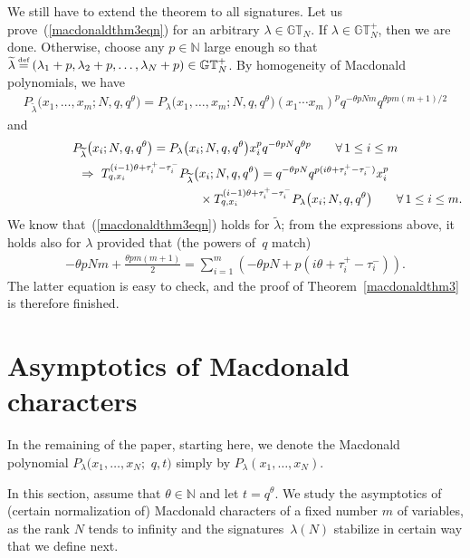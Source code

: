 \documentclass[pdftex]{sigma}
\numberwithin{equation}{section}
\newcommand\myeq{\mathrel{\stackrel{\makebox[0pt]{\mbox{\normalfont\tiny def}}}{=}}}
\newcommand{\N}{\mathbb{N}}
\newcommand{\GT}{\mathbb{GT}}
\newcommand{\GTp}{\mathbb{GT}^+}
\begin{document}
We still have to extend the theorem to all signatures. Let us prove~(\ref{macdonaldthm3eqn}) for an arbitrary $\lambda\in\GT_N$. If $\lambda\in\GTp_N$, then we are done. Otherwise, choose any $p\in\N$ large enough so that $\widetilde{\lambda} \myeq (\lambda_1 + p, \lambda_2 + p, \dots, \lambda_N + p)\in\GTp_N$. By homogeneity of Macdonald polynomials, we have
\begin{gather*}
P_{\widetilde{\lambda}}\big(x_1, \dots, x_m; N, q, q^{\theta}\big) = P_{\lambda}\big(x_1, \dots, x_m; N, q, q^{\theta}\big) (x_1\cdots x_m)^p q^{-\theta p N m}q^{\theta pm(m+1)/2}
\end{gather*}
and
\begin{gather*}
P_{\widetilde{\lambda}}\big(x_i; N, q, q^{\theta}\big) = P_{\lambda}\big(x_i; N, q, q^{\theta}\big) x_i^p q^{-\theta p N}q^{\theta p} \qquad \forall\, 1\leq i\leq m\\
\Rightarrow \ T_{q, x_i}^{(i-1)\theta + \tau_i^+ - \tau_i^-}P_{\widetilde{\lambda}}\big(x_i; N, q, q^{\theta}\big) = q^{-\theta p N}q^{p(i\theta + \tau_i^+ - \tau_i^-)}x_i^p \\
\hphantom{\Rightarrow \ T_{q, x_i}^{(i-1)\theta + \tau_i^+ - \tau_i^-}P_{\widetilde{\lambda}}\big(x_i; N, q, q^{\theta}\big) =}{} \times T_{q, x_i}^{(i-1)\theta + \tau_i^+ - \tau_i^-}P_{\lambda}\big(x_i; N, q, q^{\theta}\big) \qquad \forall\, 1\leq i\leq m.
\end{gather*}
We know that~(\ref{macdonaldthm3eqn}) holds for $\widetilde{\lambda}$; from the expressions above, it holds also for $\lambda$ provided that (the powers of~$q$ match)
\begin{gather*}
-\theta p N m + \frac{\theta p m(m+1)}{2} = \sum_{i=1}^m{(-\theta p N + p (i\theta + \tau_i^+ - \tau_i^-))}.
\end{gather*}
The latter equation is easy to check, and the proof of Theorem~\ref{macdonaldthm3} is therefore f\/inished.

\section{Asymptotics of Macdonald characters}\label{sec:asymptotics}

In the remaining of the paper, starting here, we denote the Macdonald polynomial $P_{\lambda}(x_1, \dots, x_N;$ $q, t)$ simply by $P_{\lambda}(x_1, \dots, x_N)$.

In this section, assume that $\theta\in\N$ and let $t = q^{\theta}$. We study the asymptotics of (certain normalization of) Macdonald characters of a f\/ixed number $m$ of variables, as the rank $N$ tends to inf\/inity and the signatures~$\lambda(N)$ stabilize in certain way that we def\/ine next.
\end{document}
